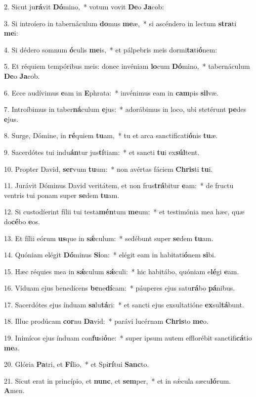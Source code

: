 2. Sicut ju\textbf{rá}vit \textbf{Dó}mino,~*  votum vovit \textbf{De}o \textbf{Ja}cob:\

3. Si introíero in tabernáculum \textbf{do}mus \textbf{me}æ,~*  si ascéndero in lectum \textbf{stra}ti \textbf{me}i:\

4. Si dédero somnum \textbf{ó}culis \textbf{me}is,~*  et pálpebris meis dormi\textbf{ta}ti\textbf{ó}nem:\

5. Et réquiem tempóribus meis: donec invéniam \textbf{lo}cum \textbf{Dó}mino,~*  tabernáculum \textbf{De}o \textbf{Ja}cob.\

6. Ecce audívimus \textbf{e}am in \textbf{E}phrata:~*  invénimus eam in \textbf{cam}pis \textbf{sil}væ.\

7. Introíbimus in taber\textbf{ná}culum \textbf{e}jus:~*  adorábimus in loco, ubi stetérunt \textbf{pe}des \textbf{e}jus.\

8. Surge, Dómine, in \textbf{ré}quiem \textbf{tu}am,~*  tu et arca sanctificati\textbf{ó}nis \textbf{tu}æ.\

9. Sacerdótes tui indu\textbf{án}tur jus\textbf{tí}tiam:~*  et sancti \textbf{tu}i ex\textbf{súl}tent.\

10. Propter David, \textbf{ser}vum \textbf{tu}um:~*  non avértas fáciem \textbf{Chris}ti \textbf{tu}i.\

11. Jurávit Dóminus David veritátem, et non frus\textbf{trá}bitur \textbf{e}am:~*  de fructu ventris tui ponam super \textbf{se}dem \textbf{tu}am.\

12. Si custodíerint fílii tui testa\textbf{mén}tum \textbf{me}um:~*  et testimónia mea hæc, quæ do\textbf{cé}bo \textbf{e}os.\

13. Et fílii eórum \textbf{us}que in \textbf{sǽ}culum:~*  sedébunt super \textbf{se}dem \textbf{tu}am.\

14. Quóniam elégit \textbf{Dó}minus \textbf{Si}on:~*  elégit eam in habitati\textbf{ó}nem \textbf{si}bi.\

15. Hæc réquies mea in \textbf{sǽ}culum \textbf{sǽ}culi:~*  hic habitábo, quóniam e\textbf{lé}gi \textbf{e}am.\

16. Víduam ejus benedícens \textbf{be}ne\textbf{dí}cam:~*  páuperes ejus satu\textbf{rá}bo \textbf{pá}nibus.\

17. Sacerdótes ejus índuam \textbf{sa}lu\textbf{tá}ri:~*  et sancti ejus exsultatióne \textbf{ex}sul\textbf{tá}bunt.\

18. Illuc prodúcam \textbf{cor}nu \textbf{Da}vid:~*  parávi lucérnam \textbf{Chris}to \textbf{me}o.\

19. Inimícos ejus índuam con\textbf{fu}si\textbf{ó}ne:~*  super ipsum autem efflorébit sanctifi\textbf{cá}tio \textbf{me}a.\

20. Glória \textbf{Pa}tri, et \textbf{Fí}lio,~*  et Spi\textbf{rí}tui \textbf{Sanc}to.\

21. Sicut erat in princípio, et \textbf{nunc}, et \textbf{sem}per,~*  et in sǽcula sæcu\textbf{ló}rum. \textbf{A}men.\

